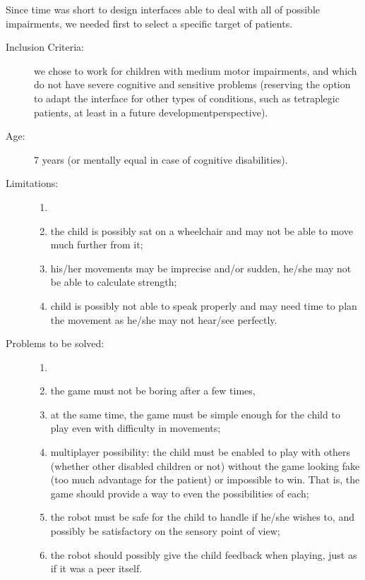 \documentclass[a4paper,twoside]{book}
\begin{document}
\beforelist Since time was short to design interfaces able to deal with all of possible impairments, we needed first to select a specific target of patients.
\begin{description}
\item[Inclusion Criteria:] we chose to work for children with medium motor impairments, and which do not have severe cognitive and sensitive problems (reserving the option to adapt the interface for other types of conditions, such as tetraplegic patients, at least in a future development\textendash perspective).
\item[Age:] 7 years (or mentally equal in case of cognitive disabilities).
\item[Limitations:]
  \begin{enumerate}
    \item[]
    \item the child is possibly sat on a wheelchair and may not be able to move much further from it;
    \item his/her movements may be imprecise and/or sudden, he/she may not be able to calculate strength;
    \item child is possibly not able to speak properly and may need time to plan the movement as he/she may not hear/see perfectly.
  \end{enumerate}
\item[Problems to be solved:]
  \begin{enumerate}
    \item[]
    \item the game must not be boring after a few times,
    \item at the same time, the game must be simple enough for the child to play even with difficulty in movements;
    \item multi\textendash player possibility: the child must be enabled to play with others (whether other disabled children or not) without the game looking fake (too much advantage for the patient) or impossible to win. That is, the game should provide a way to even the possibilities of each;
    \item the robot must be safe for the child to handle if he/she wishes to, and possibly be satisfactory on the sensory point of view;
    \item the robot should possibly give the child feedback when playing, just as if it was a peer itself.
  \end{enumerate}
\end{description}
\afterlist*
\end{document}
